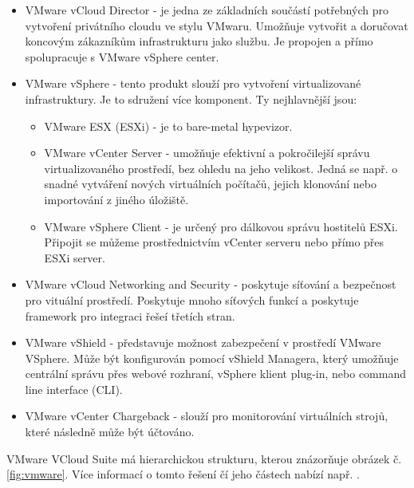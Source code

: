 \begin{itemize}
\item VMware vCloud Director - je  jedna  ze základních součástí potřebných pro vytvoření  privátního  cloudu ve stylu VMwaru.  Umožňuje vytvořit  a  doručovat  koncovým  zákazníkům infrastrukturu jako službu. Je propojen a přímo spolupracuje s VMware vSphere center.
\item VMware vSphere - tento produkt slouží pro vytvoření virtualizované infrastruktury. Je to sdružení více komponent. Ty nejhlavnější jsou:
\begin{itemize}
\item VMware ESX (ESXi) - je to bare-metal hypevizor.
\item VMware vCenter Server - umožňuje efektivní a pokročilejší správu virtualizovaného prostředí, bez ohledu na jeho velikost. Jedná se např. o snadné vytváření nových virtuálních počítačů, jejich klonování  nebo  importování  z jiného  úložiště.  
\item VMware vSphere Client - je určený pro dálkovou správu hostitelů ESXi. Připojit se můžeme prostřednictvím vCenter serveru nebo přímo přes ESXi server.
\end{itemize} 
\item VMware vCloud Networking and Security - poskytuje síťování a bezpečnost pro vituální prostředí. Poskytuje mnoho síťových funkcí a poskytuje framework pro integraci řešeí třetích stran.
\item VMware vShield - představuje možnost zabezpečení v prostředí VMware VSphere. Může být konfigurován pomocí vShield Managera, který umožňuje centrální správu přes webové rozhraní, vSphere klient plug-in, nebo command line interface (CLI).
\item VMware vCenter Chargeback - slouží pro monitorování virtuálních strojů, které následně může být účtováno.
\end{itemize}

VMware VCloud Suite má hierarchickou strukturu, kterou znázorňuje obrázek č. \ref{fig:vmware}. Více informací o tomto řešení čí jeho částech nabízí např. \cite{vmware} .

